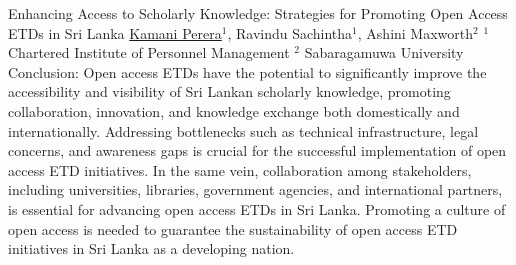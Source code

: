 \begin{abstract_online}{Enhancing Access to Scholarly Knowledge: Strategies for Promoting Open Access ETDs in Sri Lanka}{%
        \underline{Kamani Perera}$^{1}$, Ravindu Sachintha$^{1}$, Ashini Maxworth$^{2}$}{%
        }{
        $^1$ Chartered Institute of Personnel Management\newline{}
        $^2$ Sabaragamuwa University}
    Conclusion: Open access ETDs have the potential to significantly improve the accessibility and visibility of Sri Lankan scholarly knowledge, promoting collaboration, innovation, and knowledge exchange both domestically and internationally. Addressing bottlenecks such as technical infrastructure, legal concerns, and awareness gaps is crucial for the successful implementation of open access ETD initiatives. In the same vein, collaboration among stakeholders, including universities, libraries, government agencies, and international partners, is essential for advancing open access ETDs in Sri Lanka. Promoting a culture of open access is needed to guarantee the sustainability of open access ETD initiatives in Sri Lanka as a developing nation.
\end{abstract_online}

